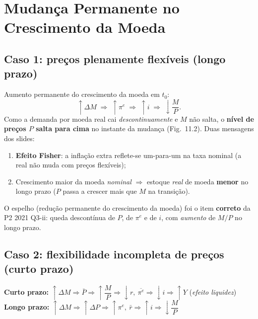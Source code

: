 \documentclass[12pt, a4paper]{article}
\begin{document}
\section{Mudança Permanente no Crescimento da Moeda}

\subsection{Caso 1: preços plenamente flexíveis (longo prazo)}

Aumento permanente do crescimento da moeda em $t_0$:
\[
\uparrow \Delta M \;\Rightarrow\; \uparrow \pi^e \;\Rightarrow\; \uparrow i
\;\Rightarrow\; \downarrow \frac{M}{P}.
\]
Como a demanda por moeda real cai \emph{descontinuamente} e $M$ não salta, o
\textbf{nível de preços $P$ salta para cima} no instante da mudança
(Fig.\ 11.2). Duas mensagens dos slides:
\begin{enumerate}[leftmargin=1.6em]
\item \textbf{Efeito Fisher}: a inflação extra reflete-se um-para-um na taxa
nominal (a real não muda com preços flexíveis);
\item Crescimento maior da moeda \emph{nominal} $\Rightarrow$ estoque
\emph{real} de moeda \textbf{menor} no longo prazo ($P$ passa a crescer mais
que $M$ na transição).
\end{enumerate}

O espelho (redução permanente do crescimento da moeda) foi o item
\textbf{correto} da P2 2021 Q3-ii: queda descontínua de $P$, de $\pi^e$ e de
$i$, com \emph{aumento} de $M/P$ no longo prazo.

\subsection{Caso 2: flexibilidade incompleta de preços (curto prazo)}

\begin{formulabox}[title={Efeito liquidez vs.\ longo prazo (slides)}]
\textbf{Curto prazo:}\quad
$\uparrow \Delta M \Rightarrow \bar P \Rightarrow \uparrow \dfrac{M}{P}
\Rightarrow \downarrow r,\ \overline{\pi^e}
\Rightarrow \downarrow i \Rightarrow \uparrow Y$
\hfill (\emph{efeito liquidez})\\[0.4em]
\textbf{Longo prazo:}\quad
$\uparrow \Delta M \Rightarrow \uparrow \Delta P \Rightarrow
\uparrow \pi^e,\ \bar r \Rightarrow \uparrow i
\Rightarrow \downarrow \dfrac{M}{P}$
\end{formulabox}
\end{document}

